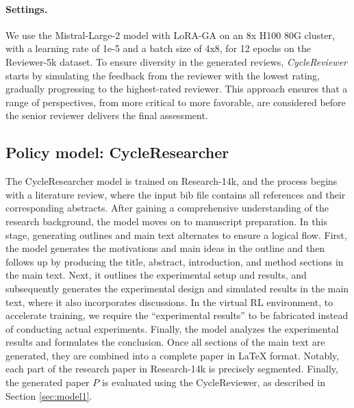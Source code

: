 \documentclass{article} %
\begin{document}
\paragraph{Settings.} We use the Mistral-Large-2 model with LoRA-GA \citep{wang2024loragalowrankadaptationgradient} on an 8x H100 80G cluster, with a learning rate of 1e-5 and a batch size of 4x8, for 12 epochs on the Reviewer-5k dataset. To ensure diversity in the generated reviews, \textit{CycleReviewer} starts by simulating the feedback from the reviewer with the lowest rating, gradually progressing to the highest-rated reviewer. This approach ensures that a range of perspectives, from more critical to more favorable, are considered before the senior reviewer delivers the final assessment.

\subsection{Policy model: CycleResearcher}
\label{sec:model2}

The CycleResearcher model is trained on Research-14k, and the process begins with a literature review, where the input bib file contains all references and their corresponding abstracts. After gaining a comprehensive understanding of the research background, the model moves on to manuscript preparation. In this stage, generating outlines and main text alternates to ensure a logical flow. First, the model generates the motivations and main ideas in the outline and then follows up by producing the title, abstract, introduction, and method sections in the main text. Next, it outlines the experimental setup and results, and subsequently generates the experimental design and simulated results in the main text, where it also incorporates discussions. In the virtual RL environment, to accelerate training, we require the ``experimental results'' to be fabricated instead of conducting actual experiments. Finally, the model analyzes the experimental results and formulates the conclusion. Once all sections of the main text are generated, they are combined into a complete paper in LaTeX format. Notably, each part of the research paper in Research-14k is precisely segmented. Finally, the generated paper $P$ is evaluated using the CycleReviewer, as described in Section \ref{sec:model1}.

\end{document}
